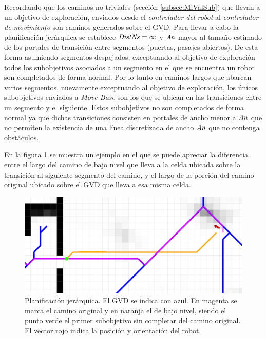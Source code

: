 Recordando que los caminos no triviales (sección \ref{subsec:MiValSub}) que llevan a un objetivo de exploración, enviados desde el
\emph{controlador del robot} al \emph{controlador de movimiento} son caminos
generados sobre el GVD. Para llevar a cabo la planificación jerárquica se
establece $\mathit{DistNs}=\infty$ y $\mathit{An}$ mayor al tamaño estimado de los
portales de transición entre segmentos (puertas, pasajes abiertos). De esta
forma asumiendo segmentos despejados, exceptuando al objetivo de exploración todos los subobjetivos asociados a un
segmento en el que se encuentra un robot son completados de forma normal. Por
lo tanto en caminos largos que abarcan varios segmentos, nuevamente exceptuando al objetivo de exploración, los únicos
subobjetivos enviados a \emph{Move Base} son los que se ubican en las
transiciones entre un segmento y el siguiente. Estos subobjetivos no son
completados de forma normal ya que dichas transiciones consisten en portales de
ancho menor a $\mathit{An}$ que no permiten la existencia de una línea discretizada
de ancho $\mathit{An}$ que no contenga obstáculos.

En la figura \ref{fig:navjer} se muestra un ejemplo en el que se puede apreciar
la diferencia entre el largo del camino de bajo nivel que lleva a la celda
ubicada sobre la transición al siguiente segmento del camino, y el largo de la porción del
camino original ubicado sobre el GVD que lleva a esa misma celda.


\begin{figure}[H]
  \center
  \includegraphics[width=1\linewidth]{imagenes/navjer/caso1/a.png}
  \caption[Planificación jerárquica.]{Planificación jerárquica. El GVD
    se indica con azul. En magenta se marca el camino original y en
    naranja el de bajo nivel, siendo el punto verde el primer
    subobjetivo sin completar del camino original. El vector rojo indica
    la posición y orientación del robot.
 }
  \label{fig:navjer}
\end{figure} 


